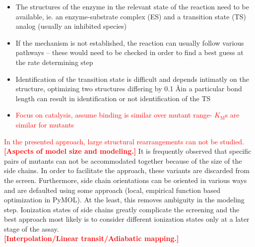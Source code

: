 \begin{itemize}
\item The structures of the enzyme in the relevant state of the reaction need to be available, ie. an enzyme-substrate complex (ES) and a transition state (TS) analog (usually an inhibited species)
\item If the mechanism is not established, the reaction can usually follow various pathways -- these would need to be checked in order to find a best guess at the rate determining step
\item Identification of the transition state is difficult and depends intimatly on the structure, optimizing two structures differing by 0.1 \AA in a particular bond length can result in identification or not identification of the TS
\item \textcolor{red}{Focus on catalysis, assume binding is similar over mutant range\cite{ludwiczek2013strategies}- $K_\text{M}$s are similar for mutants}
\end{itemize}
\textcolor{red}{In the presented approach, large structural rearrangements can not be studied.}\\
\textcolor{red}{\textbf{[Aspects of model size and modeling.]}}
It is frequently observed that specific pairs of mutants can not be accommodated together because of the size of the side chains.
In order to facilitate the approach, these variants are discarded from the screen.
Furthermore, side chain orientations can be oriented in various ways and are defaulted using some approach (local, empirical function based optimization in PyMOL).
At the least, this removes ambiguity in the modeling step.
Ionization states of side chains greatly complicate the screening and the best approach most likely is to consider different ionization states only at a later stage of the assay.\\
\textcolor{red}{\textbf{[Interpolation/Linear transit/Adiabatic mapping.]}}
